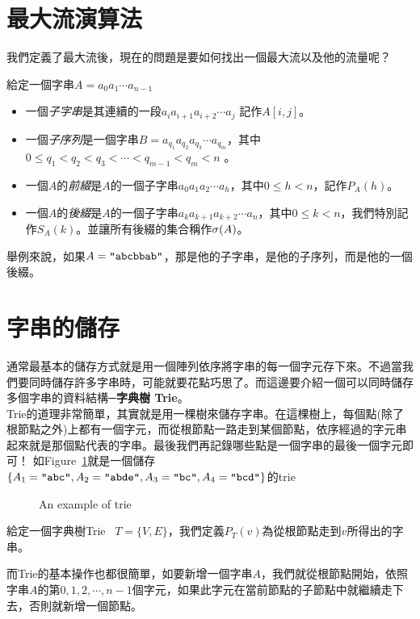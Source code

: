 \documentclass[a4paper,12pt]{book}
\begin{document}
\section{最大流演算法}
我們定義了最大流後，現在的問題是要如何找出一個最大流以及他的流量呢？

\begin{theorem}[定義]
  給定一個字串$A = a_0 a_1 \cdots a_{n-1}$
\begin{itemize}
  \item 一個\emph{子字串}是其連續的一段$a_i a_{i+1} a_{i+2} \cdots a_j$ 記作$A[i,j]$。
\item 一個\emph{子序列}是一個字串$B = a_{q_1} a_{q_2} a_{q_3} \cdots a_{q_m}$，其中$0 \leq q_1 < q_2 < q_3 < \cdots < q_{m-1} < q_m < n$ 。
\item 一個$A$的\emph{前綴}是$A$的一個子字串$a_0 a_1 a_2 \cdots a_{h}$，其中$0 \leq h < n$，記作$P_A(h)$。
\item 一個$A$的\emph{後綴}是$A$的一個子字串$a_k a_{k+1} a_{k+2} \cdots a_n$，其中$0 \leq k < n$，我們特別記作$S_A(k)$。並讓所有後綴的集合稱作$\operatorname{\sigma}(A)$。
\end{itemize}
\end{theorem}
舉例來說，如果$A = \texttt{"abcbbab"}$，那是他的子字串，是他的子序列，而是他的一個後綴。

\section{字串的儲存}
通常最基本的儲存方式就是用一個陣列依序將字串的每一個字元存下來。不過當我們要同時儲存許多字串時，可能就要花點巧思了。而這邊要介紹一個可以同時儲存多個字串的資料結構─{\bf  字典樹 Trie}。\\
Trie的道理非常簡單，其實就是用一棵樹來儲存字串。在這棵樹上，每個點(除了根節點之外)上都有一個字元，而從根節點一路走到某個節點，依序經過的字元串起來就是那個點代表的字串。最後我們再記錄哪些點是一個字串的最後一個字元即可！
如Figure~\ref{fig:trie}就是一個儲存$\{A_1 = \texttt{"abc"}, A_2 =\texttt{"abde"}, A_3 = \texttt{"bc"}, A_4 = \texttt{"bcd"}\}$的trie
\begin{figure}[H]
  \centering
  \caption{An example of trie}
  \label{fig:trie}
\end{figure}
%
\begin{theorem}[定義]
  給定一個字典樹Trie \  $T = \{V, E\}$，我們定義$P_T(v)$為從根節點走到$v$所得出的字串。
\end{theorem}
而Trie的基本操作也都很簡單，如要新增一個字串$A$，我們就從根節點開始，依照字串$A$的第$0, 1, 2, \cdots, n-1$個字元，如果此字元在當前節點的子節點中就繼續走下去，否則就新增一個節點。
\end{document}

